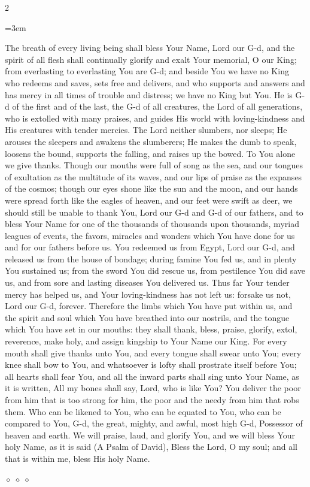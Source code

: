 \documentclass[11pt, openany]{book}
\newenvironment{bilingual}{%
  \par\vspace{4pt}%
  \begin{paracol}{2}%
}{%
  \end{paracol}%
  \par\vspace{2pt}%
}
\newenvironment{englishcol}{%
  \switchcolumn[0]%
  \begingroup
  \setstretch{1.4}%
  \emergencystretch=3em
  \tolerance=9999
  \normalsize
  \rightskip=0.12in\relax
}{%
  \endgroup
}
\newcommand{\parasep}{%
  \par\vspace{3pt}
  \begin{center}
    \textcolor{sedergold!50}{\tiny$\diamond\;\diamond\;\diamond$}
  \end{center}
  \par\vspace{3pt}
}
\begin{document}
\begin{bilingual}
\begin{englishcol}
The breath of every living being shall bless Your Name, Lord our G-d, and the spirit of all flesh shall continually glorify and exalt Your memorial, O our King; from everlasting to everlasting You are G-d; and beside You we have no King who redeems and saves, sets free and delivers, and who supports and answers and has mercy in all times of trouble and distress; we have no King but You. He is G-d of the first and of the last, the G-d of all creatures, the Lord of all generations, who is extolled with many praises, and guides His world with loving-kindness and His creatures with tender mercies. The Lord neither slumbers, nor sleeps; He arouses the sleepers and awakens the slumberers; He makes the dumb to speak, loosens the bound, supports the falling, and raises up the bowed. To You alone we give thanks. Though our mouths were full of song as the sea, and our tongues of exultation as the multitude of its waves, and our lips of praise as the expanses of the cosmos; though our eyes shone like the sun and the moon, and our hands were spread forth like the eagles of heaven, and our feet were swift as deer, we should still be unable to thank You, Lord our G-d and G-d of our fathers, and to bless Your Name for one of the thousands of thousands upon thousands, myriad leagues of events, the favors, miracles and wonders which You have done for us and for our fathers before us. You redeemed us from Egypt, Lord our G-d, and released us from the house of bondage; during famine You fed us, and in plenty You sustained us; from the sword You did rescue us, from pestilence You did save us, and from sore and lasting diseases You delivered us. Thus far Your tender mercy has helped us, and Your loving-kindness has not left us: forsake us not, Lord our G-d, forever. Therefore the limbs which You have put within us, and the spirit and soul which You have breathed into our nostrils, and the tongue which You have set in our mouths: they shall thank, bless, praise, glorify, extol, reverence, make holy, and assign kingship to Your Name our King. For every mouth shall give thanks unto You, and every tongue shall swear unto You; every knee shall bow to You, and whatsoever is lofty shall prostrate itself before You; all hearts shall fear You, and all the inward parts shall sing unto Your Name, as it is written, All my bones shall say, Lord, who is like You? You deliver the poor from him that is too strong for him, the poor and the needy from him that robs them. Who can be likened to You, who can be equated to You, who can be compared to You, G-d, the great, mighty, and awful, most high G-d, Possessor of heaven and earth. We will praise, laud, and glorify You, and we will bless Your holy Name, as it is said (A Psalm of David), Bless the Lord, O my soul; and all that is within me, bless His holy Name.
\end{englishcol}
\end{bilingual}
\parasep
\end{document}
